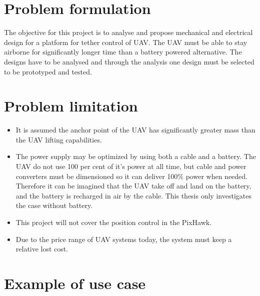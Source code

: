 \section{Problem formulation} 

The objective for this project is to analyse and propose mechanical and electrical design for a platform for tether control of UAV. The UAV must be able to stay airborne for significantly longer time than a battery powered alternative. The designs have to be analysed and through the analysis one design must be selected to be prototyped and tested.

\section{Problem limitation}
\begin{itemize}
\item It is assumed the anchor point of the UAV has significantly greater mass than the UAV lifting capabilities.
\item The power supply may be optimized by using both a cable and a battery. The UAV do not use 100 per cent of it's power at all time, but cable and power converters must be dimensioned so it can deliver 100\% power when needed. Therefore it can be imagined that the UAV take off and land on the battery, and the battery is recharged in air by the cable. This thesis only investigates the case without battery.
\item This project will not cover the position control in the PixHawk. 
\item Due to the price range of UAV systems today, the system must keep a relative lost cost. 
\end{itemize}


\section{Example of use case}

